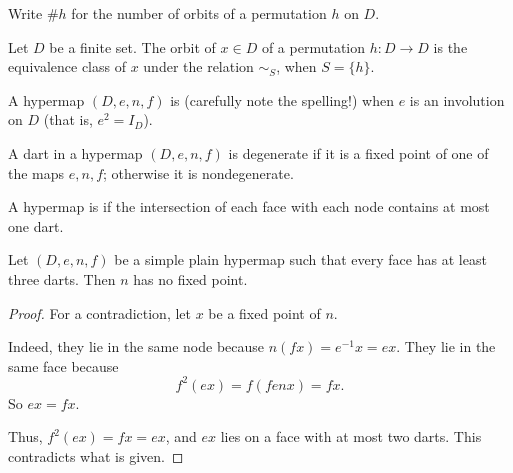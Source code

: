 Write $\#h$ for the
number of orbits of a permutation $h$ on $D$.  
%
%


\begin{lemma}
Let $D$ be a finite set.  The orbit of $x\in D$ of a permutation $h:D\to D$
is the equivalence class of $x$ under the relation $\sim_S$, when $S=\{h\}$.
\end{lemma}

\begin{definition}[plain] A hypermap $(D,e,n,f)$ is 
(carefully note the spelling!) when $e$ is an involution on $D$
(that is, $e^2 = I_D$).  
%
\end{definition}




\begin{definition}[degenerate] A dart in a hypermap $(D,e,n,f)$ 
is degenerate if it is a
fixed point of one of the maps $e,n,f$; otherwise it is nondegenerate.  
%
%
\end{definition}

\begin{definition}[simple] 
A hypermap is  if the intersection of each face with
each node contains at most one dart.  %
\end{definition}


\begin{lemma} 
Let $(D,e,n,f)$ be a simple plain hypermap such that every face has
at least three darts.
Then $n$ has no fixed point.
%
\end{lemma}

\begin{proof} For a contradiction, let $x$ be a fixed point of
$n$. 

  Indeed, they lie in the same node
because $n(f x) = e^{-1} x = e x$. They lie in the same face because
\begin{displaymath}f^2 (e x) = f (f e n x) = f x.\end{displaymath}
So $e x = f x$.

Thus, $f^2 (e x) = f x = e x$, and $e x$ lies on a
face with at most two darts.  This contradicts what is given.
\end{proof}





